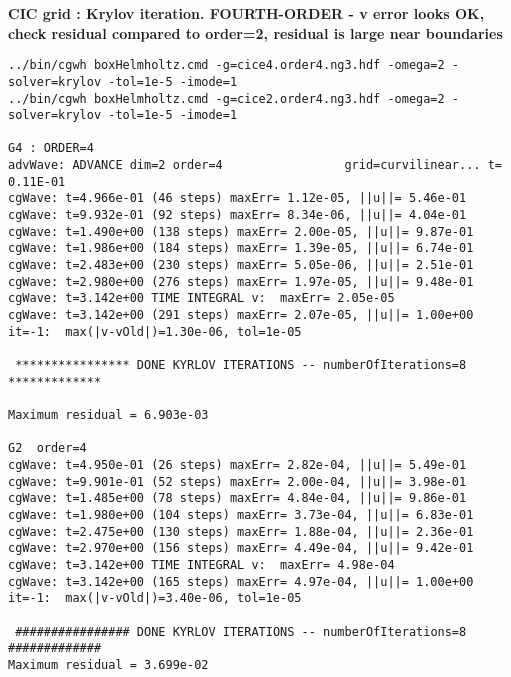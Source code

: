 \documentclass[preprint,11pt]{elsarticle}
\begin{document}
\bigskip
\textbf{CIC grid  : Krylov iteration. FOURTH-ORDER  - v error looks OK, check residual compared to order=2, residual
is large near boundaries}
\begin{Verbatim}[fontsize=\scriptsize]
../bin/cgwh boxHelmholtz.cmd -g=cice4.order4.ng3.hdf -omega=2 -solver=krylov -tol=1e-5 -imode=1
../bin/cgwh boxHelmholtz.cmd -g=cice2.order4.ng3.hdf -omega=2 -solver=krylov -tol=1e-5 -imode=1

G4 : ORDER=4
advWave: ADVANCE dim=2 order=4                 grid=curvilinear... t=  0.11E-01
cgWave: t=4.966e-01 (46 steps) maxErr= 1.12e-05, ||u||= 5.46e-01 
cgWave: t=9.932e-01 (92 steps) maxErr= 8.34e-06, ||u||= 4.04e-01 
cgWave: t=1.490e+00 (138 steps) maxErr= 2.00e-05, ||u||= 9.87e-01 
cgWave: t=1.986e+00 (184 steps) maxErr= 1.39e-05, ||u||= 6.74e-01 
cgWave: t=2.483e+00 (230 steps) maxErr= 5.05e-06, ||u||= 2.51e-01 
cgWave: t=2.980e+00 (276 steps) maxErr= 1.97e-05, ||u||= 9.48e-01 
cgWave: t=3.142e+00 TIME INTEGRAL v:  maxErr= 2.05e-05
cgWave: t=3.142e+00 (291 steps) maxErr= 2.07e-05, ||u||= 1.00e+00 
it=-1:  max(|v-vOld|)=1.30e-06, tol=1e-05

 **************** DONE KYRLOV ITERATIONS -- numberOfIterations=8 *************

Maximum residual = 6.903e-03

G2  order=4
cgWave: t=4.950e-01 (26 steps) maxErr= 2.82e-04, ||u||= 5.49e-01 
cgWave: t=9.901e-01 (52 steps) maxErr= 2.00e-04, ||u||= 3.98e-01 
cgWave: t=1.485e+00 (78 steps) maxErr= 4.84e-04, ||u||= 9.86e-01 
cgWave: t=1.980e+00 (104 steps) maxErr= 3.73e-04, ||u||= 6.83e-01 
cgWave: t=2.475e+00 (130 steps) maxErr= 1.88e-04, ||u||= 2.36e-01 
cgWave: t=2.970e+00 (156 steps) maxErr= 4.49e-04, ||u||= 9.42e-01 
cgWave: t=3.142e+00 TIME INTEGRAL v:  maxErr= 4.98e-04
cgWave: t=3.142e+00 (165 steps) maxErr= 4.97e-04, ||u||= 1.00e+00 
it=-1:  max(|v-vOld|)=3.40e-06, tol=1e-05

 ################ DONE KYRLOV ITERATIONS -- numberOfIterations=8 #############
Maximum residual = 3.699e-02
\end{Verbatim}
\end{document}
